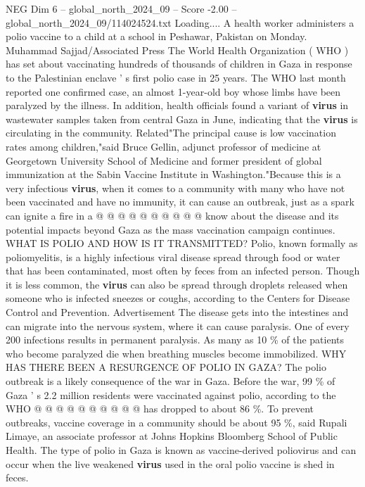 \begin{textsample}{NEG Dim 6 – global\_north\_2024\_09 – Score -2.00 – global\_north\_2024\_09/114024524.txt}  \label{ex:f6_neg_020}
Loading....
A health worker administers a polio vaccine to a child at a school in Peshawar, Pakistan on Monday.
Muhammad Sajjad/Associated Press The World Health Organization ( WHO ) has set about vaccinating hundreds of thousands of children in Gaza in response to the Palestinian enclave ' s first polio case in 25 years.
The WHO last month reported one confirmed case, an almost 1-year-old boy whose limbs have been paralyzed by the illness.
In addition, health officials found a variant of \textbf{virus} in wastewater samples taken from central Gaza in June, indicating that the \textbf{virus} is circulating in the community.
Related"The principal cause is low vaccination rates among children,"said Bruce Gellin, adjunct professor of medicine at Georgetown University School of Medicine and former president of global immunization at the Sabin Vaccine Institute in Washington."Because this is a very infectious \textbf{virus}, when it comes to a community with many who have not been vaccinated and have no immunity, it can cause an outbreak, just as a spark can ignite a fire in a @ @ @ @ @ @ @ @ @ @ know about the disease and its potential impacts beyond Gaza as the mass vaccination campaign continues.
WHAT IS POLIO AND HOW IS IT TRANSMITTED?
Polio, known formally as poliomyelitis, is a highly infectious viral disease spread through food or water that has been contaminated, most often by feces from an infected person.
Though it is less common, the \textbf{virus} can also be spread through droplets released when someone who is infected sneezes or coughs, according to the Centers for Disease Control and Prevention.
Advertisement The disease gets into the intestines and can migrate into the nervous system, where it can cause paralysis.
One of every 200 infections results in permanent paralysis.
As many as 10 \% of the patients who become paralyzed die when breathing muscles become immobilized.
WHY HAS THERE BEEN A RESURGENCE OF POLIO IN GAZA?
The polio outbreak is a likely consequence of the war in Gaza.
Before the war, 99 \% of Gaza ' s 2.2 million residents were vaccinated against polio, according to the WHO @ @ @ @ @ @ @ @ @ @ has dropped to about 86 \%.
To prevent outbreaks, vaccine coverage in a community should be about 95 \%, said Rupali Limaye, an associate professor at Johns Hopkins Bloomberg School of Public Health.
The type of polio in Gaza is known as vaccine-derived poliovirus and can occur when the live weakened \textbf{virus} used in the oral polio vaccine is shed in feces.

\end{textsample}
